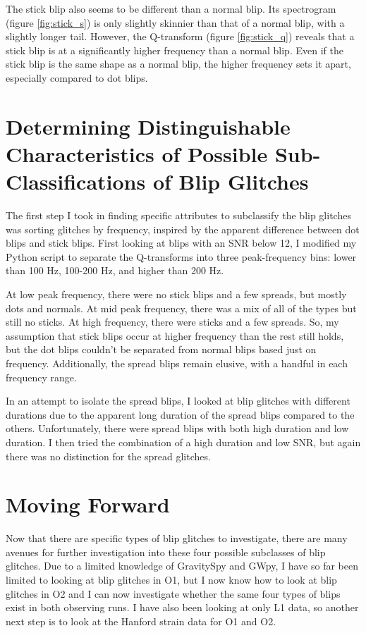 \documentclass[a4paper]{article}
\begin{document}
The stick blip also seems to be different than a normal blip. Its spectrogram (figure \ref{fig:stick_s}) is only slightly skinnier than that of a normal blip, with a slightly longer tail. However, the Q-transform (figure \ref{fig:stick_q}) reveals that a stick blip is at a significantly higher frequency than a normal blip. Even if the stick blip is the same shape as a normal blip, the higher frequency sets it apart, especially compared to dot blips.

\section{Determining Distinguishable Characteristics of Possible Sub-Classifications of Blip Glitches}

The first step I took in finding specific attributes to subclassify the blip glitches was sorting glitches by frequency, inspired by the apparent difference between dot blips and stick blips. First looking at blips with an SNR below 12, I modified my Python script to separate the Q-transforms into three peak-frequency bins: lower than 100 Hz, 100-200 Hz, and higher than 200 Hz. 

At low peak frequency, there were no stick blips and a few spreads, but mostly dots and normals. At mid peak frequency, there was a mix of all of the types but still no sticks. At high frequency, there were sticks and a few spreads. So, my assumption that stick blips occur at higher frequency than the rest still holds, but the dot blips couldn't be separated from normal blips based just on frequency. Additionally, the spread blips remain elusive, with a handful in each frequency range.

In an attempt to isolate the spread blips, I looked at blip glitches with different durations due to the apparent long duration of the spread blips compared to the others. Unfortunately, there were spread blips with both high duration and low duration. I then tried the combination of a high duration and low SNR, but again there was no distinction for the spread glitches. 

\section{Moving Forward}

Now that there are specific types of blip glitches to investigate, there are many avenues for further investigation into these four possible subclasses of blip glitches. Due to a limited knowledge of GravitySpy and GWpy, I have so far been limited to looking at blip glitches in O1, but I now know how to look at blip glitches in O2 and I can now investigate whether the same four types of blips exist in both observing runs. I have also been looking at only L1 data, so another next step is to look at the Hanford strain data for O1 and O2. 
\end{document}
